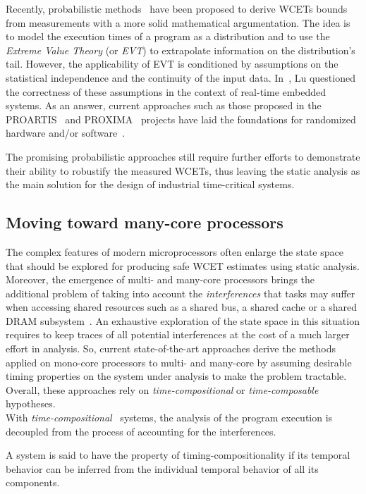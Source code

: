 \documentclass[main.tex]{subfiles}
\begin{document}
Recently, probabilistic methods~\cite{Edgar2001} have been proposed to derive
WCETs bounds from measurements with a more solid mathematical argumentation.
The idea is to model the execution times of a program as a distribution and to
use the \emph{Extreme Value Theory} (or \emph{EVT}) \cite{Embrechts1997} to
extrapolate information on the distribution's tail. However, the applicability
of EVT is conditioned by assumptions on the statistical independence and the
continuity of the input data. In~\cite{Lu2011}, Lu \etal questioned the
correctness of these assumptions in the context of real-time embedded systems.
As an answer, current approaches such as those proposed in the
PROARTIS~\cite{Proartis} and PROXIMA~\cite{Proxima} projects have laid the
foundations for randomized hardware and/or
software~\cite{BerezovskyiGSBT16,GuetSM16}.

The promising probabilistic approaches still require further efforts to
demonstrate their ability to robustify the measured WCETs, thus leaving the
static analysis as the main solution for the design of industrial time-critical
systems.


\subsection{Moving toward many-core processors}

The complex features of modern microprocessors often enlarge the state space
that should be explored for producing safe WCET estimates using static
analysis. Moreover, the emergence of multi- and many-core processors brings the
additional problem of taking into account the \emph{interferences} that tasks
may suffer when accessing shared resources such as a shared bus, a shared cache
or a shared DRAM subsystem~\cite{Wilhelm2012}. An exhaustive exploration of the
state space in this situation requires to keep traces of all potential
interferences at the cost of a much larger effort in analysis. So, current
state-of-the-art approaches derive the methods applied on mono-core processors
to multi- and many-core by assuming desirable timing properties on the system
under analysis to make the problem tractable. Overall, these approaches rely on
\emph{time-compositional} or \emph{time-composable} hypotheses. \\

With \emph{time-compositional}~\cite{Hahn2015} systems, the analysis of the
program execution is decoupled from the process of accounting for the
interferences. 
\begin{definition}
    \label{def_stateOfTheArt_timeCompositional}
    A system is said to have the property of timing-compositionality if its
    temporal behavior can be inferred from the individual temporal behavior of
    all its components. 
\end{definition}
\end{document}
